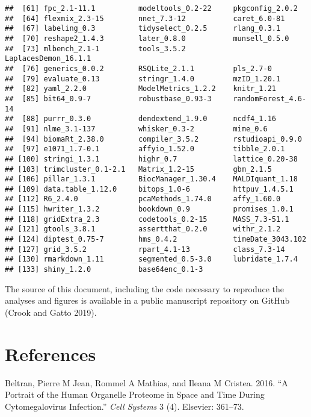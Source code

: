 \documentclass[]{article}
\begin{document}
\begin{verbatim}
##  [61] fpc_2.1-11.1          modeltools_0.2-22     pkgconfig_2.0.2      
##  [64] flexmix_2.3-15        nnet_7.3-12           caret_6.0-81         
##  [67] labeling_0.3          tidyselect_0.2.5      rlang_0.3.1          
##  [70] reshape2_1.4.3        later_0.8.0           munsell_0.5.0        
##  [73] mlbench_2.1-1         tools_3.5.2           LaplacesDemon_16.1.1 
##  [76] generics_0.0.2        RSQLite_2.1.1         pls_2.7-0            
##  [79] evaluate_0.13         stringr_1.4.0         mzID_1.20.1          
##  [82] yaml_2.2.0            ModelMetrics_1.2.2    knitr_1.21           
##  [85] bit64_0.9-7           robustbase_0.93-3     randomForest_4.6-14  
##  [88] purrr_0.3.0           dendextend_1.9.0      ncdf4_1.16           
##  [91] nlme_3.1-137          whisker_0.3-2         mime_0.6             
##  [94] biomaRt_2.38.0        compiler_3.5.2        rstudioapi_0.9.0     
##  [97] e1071_1.7-0.1         affyio_1.52.0         tibble_2.0.1         
## [100] stringi_1.3.1         highr_0.7             lattice_0.20-38      
## [103] trimcluster_0.1-2.1   Matrix_1.2-15         gbm_2.1.5            
## [106] pillar_1.3.1          BiocManager_1.30.4    MALDIquant_1.18      
## [109] data.table_1.12.0     bitops_1.0-6          httpuv_1.4.5.1       
## [112] R6_2.4.0              pcaMethods_1.74.0     affy_1.60.0          
## [115] hwriter_1.3.2         bookdown_0.9          promises_1.0.1       
## [118] gridExtra_2.3         codetools_0.2-15      MASS_7.3-51.1        
## [121] gtools_3.8.1          assertthat_0.2.0      withr_2.1.2          
## [124] diptest_0.75-7        hms_0.4.2             timeDate_3043.102    
## [127] grid_3.5.2            rpart_4.1-13          class_7.3-14         
## [130] rmarkdown_1.11        segmented_0.5-3.0     lubridate_1.7.4      
## [133] shiny_1.2.0           base64enc_0.1-3
\end{verbatim}

The source of this document, including the code necessary to reproduce
the analyses and figures is available in a public manuscript repository
on GitHub (Crook and Gatto 2019).

\section*{References}\label{references}

\hypertarget{refs}{}
\hypertarget{ref-Beltran:2016}{}
Beltran, Pierre M Jean, Rommel A Mathias, and Ileana M Cristea. 2016.
``A Portrait of the Human Organelle Proteome in Space and Time During
Cytomegalovirus Infection.'' \emph{Cell Systems} 3 (4). Elsevier:
361--73.
\end{document}
